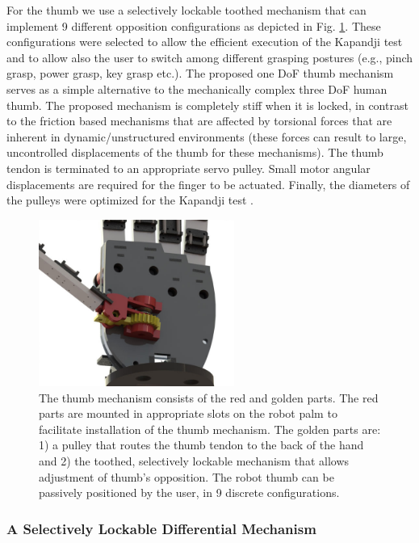 For the thumb we use a selectively lockable toothed mechanism that can implement 9 different opposition configurations as depicted in Fig. \ref{thumb}. These configurations were selected to allow the efficient execution of the Kapandji test \cite{Kapandji} and to allow also the user to switch among different grasping postures (e.g., pinch grasp, power grasp, key grasp etc.). The proposed one DoF thumb mechanism serves as a simple alternative to the mechanically complex three DoF human thumb. The proposed mechanism is completely stiff when it is locked, in contrast to the friction based mechanisms \cite{Baril} that are affected by torsional forces that are inherent in dynamic/unstructured environments (these forces can result to large, uncontrolled displacements of the thumb for these mechanisms). The thumb tendon is terminated to an appropriate servo pulley. Small motor angular displacements are required for the finger to be actuated. Finally, the diameters of the pulleys were optimized for the Kapandji test \cite{Kapandji}.

\begin{figure}[h]
\begin{center}
\includegraphics[width=6.4cm]{figures/paper_images/thumbmechanism.jpg}
\end{center}
\caption{The thumb mechanism consists of the red and golden parts. The red parts are mounted in appropriate slots on the robot palm to facilitate installation of the thumb mechanism. The golden parts are: 1) a pulley that routes the thumb tendon to the back of the hand and 2) the toothed, selectively lockable mechanism that allows adjustment of thumb's opposition. The robot thumb can be passively positioned by the user, in 9 discrete configurations.} 
\label{thumb}
\end{figure}

\subsubsection{A Selectively Lockable Differential Mechanism}

